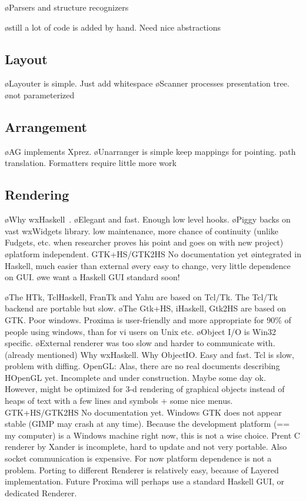 \bl
\o Parsers and structure recognizers
\el

\bl
\o still a lot of code is added by hand. Need nice abstractions
\el

\subsection{Layout}

\bl
\o Layouter is simple. Just add whitespace
\el
\bl
\o Scanner processes presentation tree.
\o not parameterized
\el

\subsection{Arrangement}

\bl
\o AG implements Xprez. 
\o Unarranger is simple keep mappings for pointing. path translation. Formatters require little more work
\el

\subsection{Rendering}

\bl
\o Why wxHaskell~\cite{wxHaskell}. 
\o Elegant and fast. Enough low level hooks.
\o Piggy backs on vast wxWidgets library. low maintenance, more chance of continuity (unlike Fudgets, etc. when researcher proves his point and goes on with new project)
\o platform independent.  GTK+HS/GTK2HS No documentation yet
\o integrated in Haskell, much easier than external
\o very easy to change, very little dependence on GUI.
\o we want a Haskell GUI standard soon! 
\el

\bl
\o   The HTk, TclHaskell, FranTk and Yahu are based on Tcl/Tk. The Tcl/Tk backend are portable but slow. 
\o The Gtk+HS, iHaskell, Gtk2HS are based on GTK. Poor windows. Proxima is user-friendly and more appropriate for 90\%
of people using windows, than for vi users on Unix etc.
\el
\bl
\o Object I/O is Win32 specific.
\o External renderer was too slow and harder to communicate with. (already mentioned)
\el
\bc
Why wxHaskell.
Why ObjectIO. 
Easy and fast.
Tcl is slow, problem with diffing. 
OpenGL: Alas, there are no real documents describing HOpenGL yet. Incomplete and under construction. Maybe some day ok. However, might be optimized for 3-d rendering of graphical objects instead of heaps of text with a few lines and symbols + some nice menus.
GTK+HS/GTK2HS No documentation yet. Windows GTK does not appear stable (GIMP may crash at any time). Because the development platform (== my computer) is a Windows machine right now, this is not a wise choice.
Prent C renderer by Xander is incomplete, hard to update and not very portable. Also socket communication is expensive.
For now platform dependence is not a problem.
Porting to different Renderer is relatively easy, because of Layered implementation.
Future Proxima will perhaps use a standard Haskell GUI, or dedicated Renderer.
\ec

